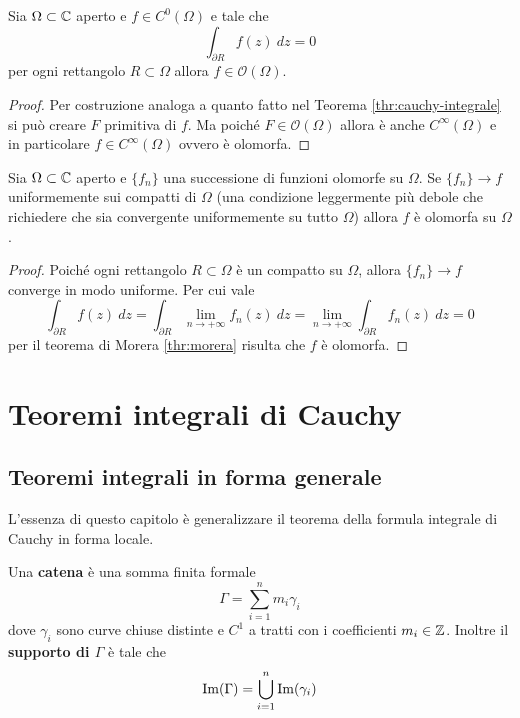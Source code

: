 \begin{theorem}[Morera]
  Sia $\Omega \subset \mathbb{C}$ aperto e $f \in C^0(\Omega)$ e tale che 
    \begin{equation*}
      \int_{\partial R} f(z)\ dz = 0 
    \end{equation*}
    per ogni rettangolo $R \subset \Omega$ allora $f \in
    \mathcal{O}(\Omega)$. 
    \label{thr:morera}
\end{theorem}
\begin{proof}
  Per costruzione analoga a quanto fatto nel Teorema
  \ref{thr:cauchy-integrale} si può creare $F$ primitiva di $f$. Ma poiché
  $F \in \mathcal{O}(\Omega)$ allora è anche $C^{\infty}(\Omega)$ e in
  particolare $f \in C^{\infty}(\Omega)$ ovvero è olomorfa. 
\end{proof}

\begin{corollary}
  Sia $\Omega \subset \mathbb{C}$ aperto e $\{f_n\}$ una successione di funzioni
  olomorfe su $\Omega$. Se $\{f_n\} \to f$ uniformemente sui compatti di
  $\Omega$ (una condizione leggermente più debole che richiedere che sia
  convergente uniformemente su tutto $\Omega$) allora $f$ è olomorfa su
  $\Omega$.  
  \label{cor:trasmissione-olomorfismo-successione}
\end{corollary}
\begin{proof}
  Poiché ogni rettangolo $R \subset \Omega$ è un compatto su $\Omega$,
  allora $\{f_n\} \to f$ converge in modo uniforme. Per cui vale
  \begin{equation*}
    \int_{\partial R} f(z)\ dz = \int_{\partial R} \lim_{n\to+\infty}f_n(z)
    \ dz = \lim_{n\to+\infty} \int_{\partial R} f_n(z)\ dz = 0 
  \end{equation*}
  per il teorema di Morera \ref{thr:morera} risulta che $f$ è olomorfa.
\end{proof}

\section{Teoremi integrali di Cauchy}
\subsection{\textcolor{AnComp}{\textbf{Teoremi integrali in forma generale}}}

L'essenza di questo capitolo è generalizzare il teorema della formula integrale 
di Cauchy in forma locale. 

\begin{definition}
    \label{def:catena-di-curve-chiuse}
    Una \textbf{catena} è una somma finita formale 
    \begin{equation*}
      \Gamma = \sum^n_{i=1} m_i \gamma_i
    \end{equation*}
    dove $\gamma_i$ sono curve chiuse distinte e $C^1$ a tratti con
    i coefficienti $m_i \in \mathbb{Z}$. Inoltre il \textbf{supporto di $\Gamma$}
    è tale che 
    \begin{equation*}
      \operatorname{Im}(\Gamma) = \bigcup^n_{i=1} \operatorname{Im}(\gamma_i)
    \end{equation*}
\end{definition}

